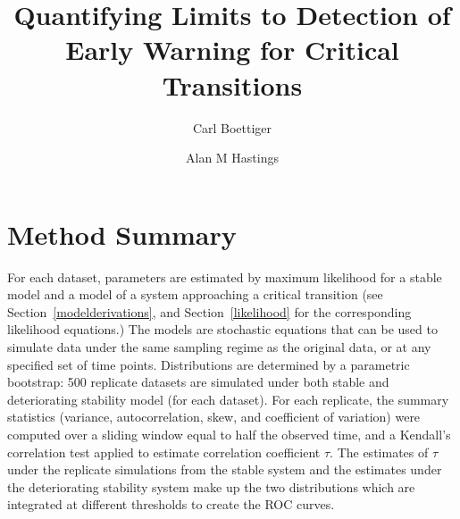 \documentclass[authoryear, preprint,review,12pt]{elsarticle}
\begin{document}
\begin{frontmatter}
\title{Quantifying Limits to Detection of Early Warning for Critical Transitions  }
\author[davis]{Carl Boettiger}
\author[davis]{Alan M Hastings}
\address[davis]{Center for Population Biology, University of California, Davis, United States}


\end{frontmatter}
%
%
%


\appendix

\section{Method Summary}
For each dataset, parameters are estimated by maximum likelihood for a stable model and a model of a system approaching a critical transition (see Section~\ref{modelderivations}, and Section~\ref{likelihood} for the corresponding likelihood equations.)  The models are stochastic equations that can be used to simulate data under the same sampling regime as the original data, or at any specified set of time points.  Distributions are determined by a parametric bootstrap: 500 replicate datasets are simulated under both stable and deteriorating stability model (for each dataset).  For each replicate, the summary statistics (variance, autocorrelation, skew, and coefficient of variation) were computed over a sliding window equal to half the observed time, and a Kendall's correlation test applied to estimate correlation coefficient $\tau$.  The estimates of $\tau$ under the replicate simulations from the stable system and the estimates under the deteriorating stability system make up the two distributions which are integrated at different thresholds to create the ROC curves.  
\end{document}

